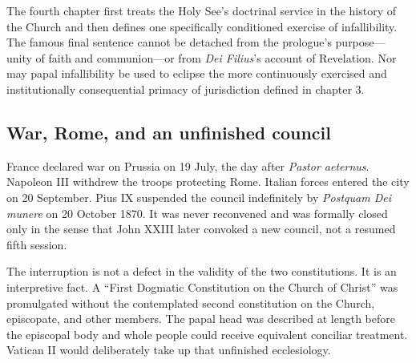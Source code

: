 The fourth chapter first treats the Holy See's doctrinal service in the history of the Church and then defines one specifically conditioned exercise of infallibility. The famous final sentence cannot be detached from the prologue's purpose—unity of faith and communion—or from \emph{Dei Filius}'s account of Revelation. Nor may papal infallibility be used to eclipse the more continuously exercised and institutionally consequential primacy of jurisdiction defined in chapter 3.

\subsection{War, Rome, and an unfinished council}

France declared war on Prussia on 19 July, the day after \emph{Pastor aeternus}. Napoleon III withdrew the troops protecting Rome. Italian forces entered the city on 20 September. Pius IX suspended the council indefinitely by \emph{Postquam Dei munere} on 20 October 1870. It was never reconvened and was formally closed only in the sense that John XXIII later convoked a new council, not a resumed fifth session.

The interruption is not a defect in the validity of the two constitutions. It is an interpretive fact. A “First Dogmatic Constitution on the Church of Christ” was promulgated without the contemplated second constitution on the Church, episcopate, and other members. The papal head was described at length before the episcopal body and whole people could receive equivalent conciliar treatment. Vatican II would deliberately take up that unfinished ecclesiology.

